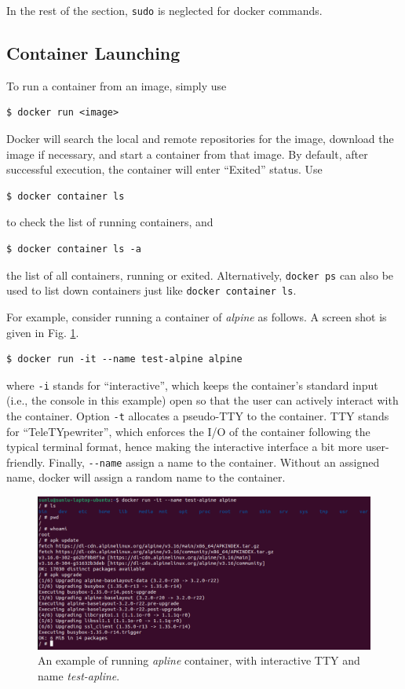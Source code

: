 In the rest of the section, \verb|sudo| is neglected for docker commands.

\subsection{Container Launching}

To run a container from an image, simply use
\begin{lstlisting}
$ docker run <image>
\end{lstlisting}
Docker will search the local and remote repositories for the image, download the image if necessary, and start a container from that image. By default, after successful execution, the container will enter ``Exited'' status. Use
\begin{lstlisting}
$ docker container ls
\end{lstlisting}
to check the list of running containers, and
\begin{lstlisting}
$ docker container ls -a
\end{lstlisting}
the list of all containers, running or exited. Alternatively, \verb|docker ps| can also be used to list down containers just like \verb|docker container ls|.

For example, consider running a container of \textit{alpine} as follows. A screen shot is given in Fig. \ref{ch:vac:fig:dockerrunexp}.
\begin{lstlisting}
$ docker run -it --name test-alpine alpine
\end{lstlisting}
where \verb|-i| stands for ``interactive'', which keeps the container's standard input (i.e., the console in this example) open so that the user can actively interact with the container. Option \verb|-t| allocates a pseudo-TTY to the container. TTY stands for ``TeleTYpewriter'', which enforces the I/O of the container following the typical terminal format, hence making the interactive interface a bit more user-friendly. Finally, \verb|--name| assign a name to the container. Without an assigned name, docker will assign a random name to the container.
\begin{figure}
	\centering
	\includegraphics[width=350pt]{chapters/ch-virtualization-and-containerization/figures/dockerrunexp.png}
	\caption{An example of running \textit{apline} container, with interactive TTY and name \textit{test-apline}.} \label{ch:vac:fig:dockerrunexp}
\end{figure}

